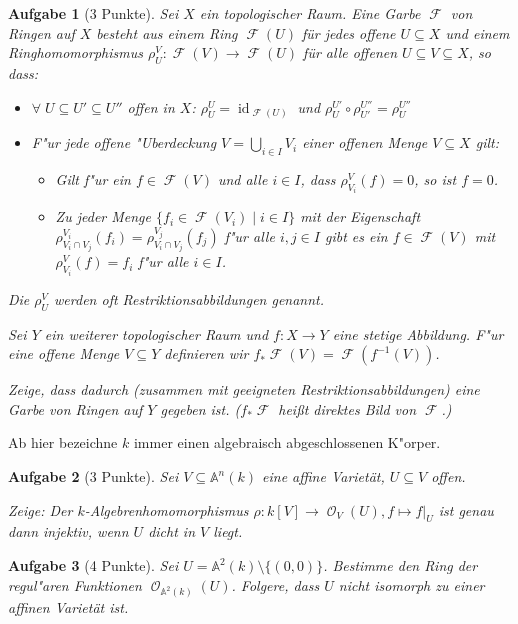 \documentclass[a4paper, 12pt, numbers=noendperiod, chapterprefix=true]{scrbook}
\theoremstyle{break}
\newtheorem{Aufg}{Aufgabe}
\theoremstyle{nonumberbreak}
\theoremstyle{nonumberplain}
\DeclareMathOperator{\id}{id}
\newcommand{\A}{\mathbb{A}}
\newcommand{\Affine}{\mathbb{A}} %
\DeclareMathOperator{\Faisceau}{\mathcal{F}} %
\DeclareMathOperator{\Reg}{\mathcal{O}} %
\begin{document}
\begin{Aufg}[3 Punkte]
Sei $X$ ein topologischer Raum. Eine Garbe $\Faisceau$ von Ringen auf $X$ besteht aus einem Ring $\Faisceau(U)$ für jedes offene $U \subseteq X$ und einem Ringhomomorphismus $\rho^V_U\colon \Faisceau(V) \to \Faisceau(U)$ für alle offenen $U \subseteq V \subseteq X$, so dass:
\begin{itemize}
	\item $\forall \; U \subseteq U' \subseteq U''$ offen in $X$: $\rho^U_U = \id_{\Faisceau(U)}$ und $\rho^{U'}_U \circ \rho^{U''}_{U'} = \rho^{U''}_{U}$
	\item F"ur jede offene "Uberdeckung $V = \bigcup_{i \in I} V_i$ einer offenen Menge $V \subseteq X$ gilt:
		\begin{itemize}
		\item Gilt f"ur ein $f \in \Faisceau(V)$ und alle $i \in I$, dass $\rho^V_{V_i}(f) = 0$, so ist $f = 0$.
		\item Zu jeder Menge $\{f_i \in \Faisceau(V_i) \mid i \in I\}$ mit der Eigenschaft $\rho^{V_i}_{V_i \cap V_j} (f_i) = \rho^{V_j}_{V_i \cap V_j} (f_j)$ f"ur alle $i, j \in I $ gibt es ein $f \in \Faisceau(V)$ mit $\rho^V_{V_i}(f) = f_i$ f"ur alle $i \in I$.
	\end{itemize}
\end{itemize}
Die $\rho^V_U$ werden oft \textit{Restriktionsabbildungen} genannt.

Sei $Y$ ein weiterer topologischer Raum und $f \colon X \to Y$ eine stetige Abbildung.
F"ur eine offene Menge $V\subseteq Y$ definieren wir $f_*\Faisceau(V) = \Faisceau(f^{-1}(V))$. 

Zeige, dass dadurch (zusammen mit geeigneten Restriktionsabbildungen) eine Garbe von Ringen auf $Y$ gegeben ist. ($f_*\Faisceau$ hei\ss t \textit{direktes Bild} von $\Faisceau$.)
\end{Aufg}

Ab hier bezeichne $k$ immer einen algebraisch abgeschlossenen K"orper.

\begin{Aufg}[3 Punkte]
Sei $V \subseteq \Affine^n(k)$ eine affine Variet\"at, $U \subseteq V$ offen. 

Zeige: Der $k$-Algebrenhomomorphismus $\rho \colon k[V] \to \Reg_V(U), f \mapsto f|_U$ ist genau dann injektiv, wenn $U$ dicht in $V$ liegt.
\end{Aufg}

\begin{Aufg}[4 Punkte]
Sei $U = \Affine^2(k)\setminus \{(0,0)\}$. Bestimme den Ring der regul"aren Funktionen $\Reg_{\Affine^2(k)}(U)$. Folgere, dass $U$ nicht isomorph zu einer affinen Variet\"at ist.
\end{Aufg}
\end{document}
